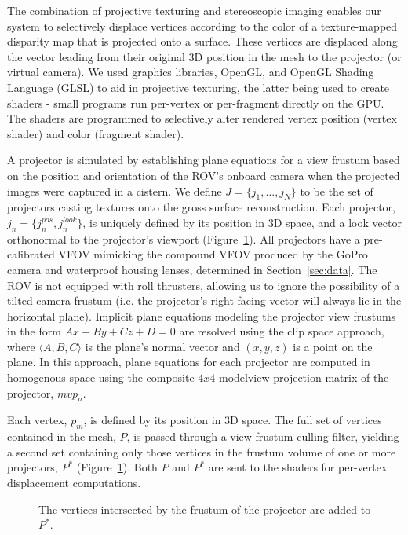 \documentclass{llncs}
\begin{document}
The combination of projective texturing and stereoscopic imaging enables our system to selectively displace vertices according to the color of a texture-mapped disparity map that is projected onto a surface. These vertices are displaced along the vector leading from their original 3D position in the mesh to the projector (or virtual camera). We used graphics libraries, OpenGL, and OpenGL Shading Language (GLSL) to aid in projective texturing, the latter being used to create shaders - small programs run per-vertex or per-fragment directly on the GPU. The shaders are programmed to selectively alter rendered vertex position (vertex shader) and color (fragment shader).

A projector is simulated by establishing plane equations for a view frustum based on the position and orientation of the ROV's onboard camera when the projected images were captured in a cistern. We define $J = \{j_{1},\dots,j_{N}\}$ to be the set of projectors casting textures onto the gross surface reconstruction. Each projector, $j_{n} = \{j_{n}^{pos}, j_{n}^{look}\}$, is uniquely defined by its position in 3D space, and a look vector orthonormal to the projector's viewport (Figure~\ref{fig:frustum}). All projectors have a pre-calibrated VFOV mimicking the compound VFOV produced by the GoPro camera and waterproof housing lenses, determined in Section~\ref{sec:data}. The ROV is not equipped with roll thrusters, allowing us to ignore the possibility of a tilted camera frustum (i.e. the projector's right facing vector will always lie in the horizontal plane). Implicit plane equations modeling the projector view frustums in the form $Ax + By + Cz + D = 0$ are resolved using the clip space approach, where $\langle A, B, C\rangle$ is the plane's normal vector and  $(x, y, z)$ is a point on the plane. In this approach, plane equations for each projector are computed in homogenous space using the composite $4x4$ modelview projection matrix of the projector, $mvp_n$. 

Each vertex, $p_{m}$, is defined by its position in 3D space. The full set of vertices contained in the mesh, $P$, is passed through a view frustum culling filter, yielding a second set containing only those vertices in the frustum volume of one or more projectors, $P^*$ (Figure~\ref{fig:frustum}). Both $P$ and $P^*$ are sent to the shaders for per-vertex displacement computations.

\begin{figure}[!h]
   \vspace{-0.2cm}
   \caption{The vertices intersected by the frustum of the projector are added to $P^*$.}
  \label{fig:frustum}
 \end{figure}
\end{document}
